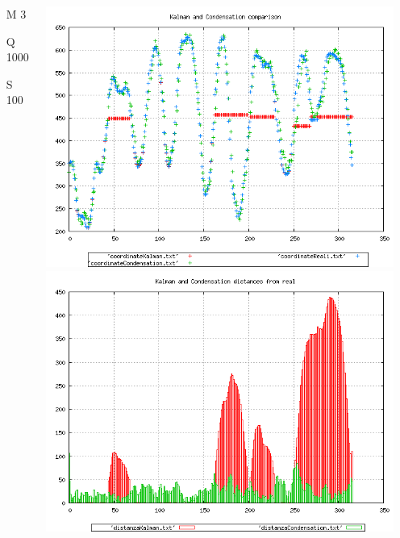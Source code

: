 {\begin{columns}
\begin{scriptsize}
\begin{itemize}
\item [M]3
\item [Q]1000
\item [S]100
\end{itemize}
\end{scriptsize}
\includegraphics[scale=0.1]{../esperimenti/movie12/mod_3-Q_1000-S_100/plot.png}\\
\includegraphics[scale=0.1]{../esperimenti/movie12/mod_3-Q_1000-S_100/plot-distances.png}
\end{columns}

}
